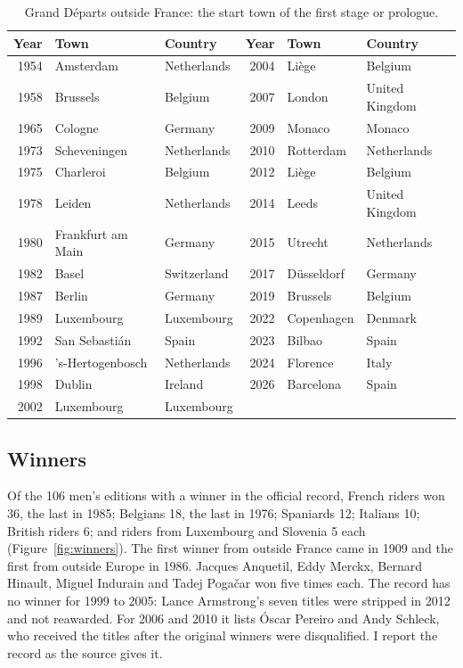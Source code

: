 \documentclass[11pt,a4paper]{article}
\begin{document}
\begin{table}[tbp]\centering\small\caption{Grand Départs outside France: the start town of the first stage or prologue.}\label{tab:gd}\begin{tabular}{rllrll}\toprule Year & Town & Country & Year & Town & Country\\\midrule
1954 & Amsterdam & Netherlands & 2004 & Liège & Belgium\\
1958 & Brussels & Belgium & 2007 & London & United Kingdom\\
1965 & Cologne & Germany & 2009 & Monaco & Monaco\\
1973 & Scheveningen & Netherlands & 2010 & Rotterdam & Netherlands\\
1975 & Charleroi & Belgium & 2012 & Liège & Belgium\\
1978 & Leiden & Netherlands & 2014 & Leeds & United Kingdom\\
1980 & Frankfurt am Main & Germany & 2015 & Utrecht & Netherlands\\
1982 & Basel & Switzerland & 2017 & Düsseldorf & Germany\\
1987 & Berlin & Germany & 2019 & Brussels & Belgium\\
1989 & Luxembourg & Luxembourg & 2022 & Copenhagen & Denmark\\
1992 & San Sebastián & Spain & 2023 & Bilbao & Spain\\
1996 & 's-Hertogenbosch & Netherlands & 2024 & Florence & Italy\\
1998 & Dublin & Ireland & 2026 & Barcelona & Spain\\
2002 & Luxembourg & Luxembourg &  & & \\
\bottomrule\end{tabular}\end{table}

\subsection{Winners}
Of the 106 men's editions with a winner in the official record, French riders won 36, the last in 1985; Belgians 18, the last in 1976; Spaniards 12; Italians 10; British riders 6; and riders from Luxembourg and Slovenia 5 each (Figure~\ref{fig:winners}). The first winner from outside France came in 1909 and the first from outside Europe in 1986. Jacques Anquetil, Eddy Merckx, Bernard Hinault, Miguel Indurain and Tadej Pogačar won five times each. The record has no winner for 1999 to 2005: Lance Armstrong's seven titles were stripped in 2012 and not reawarded. For 2006 and 2010 it lists Óscar Pereiro and Andy Schleck, who received the titles after the original winners were disqualified. I report the record as the source gives it.
\end{document}
